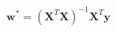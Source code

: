 \documentclass[border=3pt]{standalone}
\begin{document}
\Large $\mathbf{w}^{*}=\left(\mathbf{X}^{T}\mathbf{X}\right)^{-1}\mathbf{X}^{T}\mathbf{y}$
\end{document}
